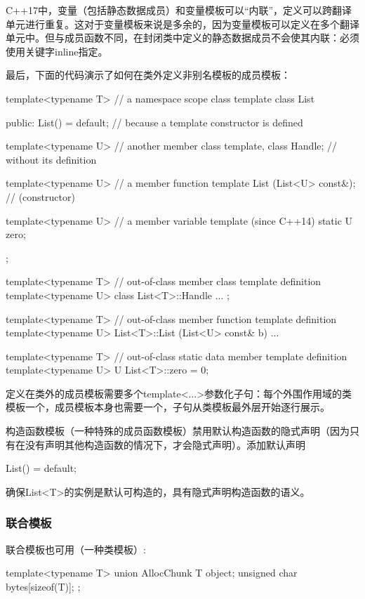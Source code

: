 C++17中，变量（包括静态数据成员）和变量模板可以“内联”，定义可以跨翻译单元进行重复。这对于变量模板来说是多余的，因为变量模板可以定义在多个翻译单元中。但与成员函数不同，在封闭类中定义的静态数据成员不会使其内联：必须使用关键字inline指定。

最后，下面的代码演示了如何在类外定义非别名模板的成员模板：

\begin{cpp}
template<typename T> // a namespace scope class template
class List {
	public:
	List() = default; // because a template constructor is defined
	
	template<typename U> // another member class template,
	class Handle; // without its definition
	
	template<typename U> // a member function template
	List (List<U> const&); // (constructor)
	
	template<typename U> // a member variable template (since C++14)
	static U zero;
};

template<typename T> // out-of-class member class template definition
  template<typename U>
class List<T>::Handle {
	...
};

template<typename T> // out-of-class member function template definition
  template<typename U>
List<T>::List (List<U> const& b)
{
	...
}

template<typename T> // out-of-class static data member template definition
  template<typename U>
U List<T>::zero = 0;
\end{cpp}

定义在类外的成员模板需要多个template<...>参数化子句：每个外围作用域的类模板一个，成员模板本身也需要一个，子句从类模板最外层开始逐行展示。

构造函数模板（一种特殊的成员函数模板）禁用默认构造函数的隐式声明（因为只有在没有声明其他构造函数的情况下，才会隐式声明）。添加默认声明

\begin{cpp}
List() = default;
\end{cpp}

确保List<T>的实例是默认可构造的，具有隐式声明构造函数的语义。

\subsubsection{联合模板}

联合模板也可用（一种类模板）:

\begin{cpp}
template<typename T>
union AllocChunk {
	T object;
	unsigned char bytes[sizeof(T)];
};
\end{cpp}

